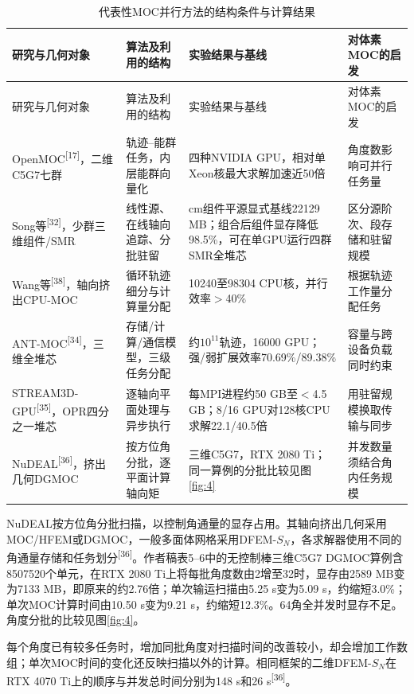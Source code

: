 \documentclass[UTF8, zihao=-4, fontset=none, a4paper]{ctexart}
\newcommand{\upcite}[1]{\textsuperscript{[#1]}}
\begin{document}
\begin{longtable}{@{}>{\raggedright\arraybackslash}p{}>{\raggedright\arraybackslash}p{}>{\raggedright\arraybackslash}p{}>{\raggedright\arraybackslash}p{}@{}}
\caption{代表性MOC并行方法的结构条件与计算结果}\label{tab:2}\\
\toprule
研究与几何对象 & 算法及利用的结构 & 实验结果与基线 & 对体素MOC的启发 \\
\midrule
\endfirsthead
\toprule
研究与几何对象 & 算法及利用的结构 & 实验结果与基线 & 对体素MOC的启发 \\
\midrule
\endhead
\bottomrule
\endlastfoot
OpenMOC\upcite{17}，二维C5G7七群 & 轨迹--能群任务，内层能群向量化 & 四种NVIDIA GPU，相对单Xeon核最大求解加速近50倍 & 角度数影响可并行任务量 \\
Song等\upcite{32}，少群三维组件/SMR & 线性源、在线轴向追踪、分批驻留 & 25 cm组件平源显式基线22129 MB；组合后组件显存降低98.5\%，可在单GPU运行四群SMR全堆芯 & 区分源阶次、段存储和驻留规模 \\
Wang等\upcite{38}，轴向挤出CPU-MOC & 循环轨迹细分与计算量分配 & 10240至98304 CPU核，并行效率$>$40\% & 根据轨迹工作量分配任务 \\
ANT-MOC\upcite{34}，三维全堆芯 & 存储/计算/通信模型，三级任务分配 & 约$10^{11}$轨迹，16000 GPU；强/弱扩展效率70.69\%/89.38\% & 容量与跨设备负载同时约束 \\
STREAM3D-GPU\upcite{35}，OPR四分之一堆芯 & 逐轴向平面处理与异步执行 & 每MPI进程约50 GB至$<$4.5 GB；8/16 GPU对128核CPU求解22.1/40.5倍 & 用驻留规模换取传输与同步 \\
NuDEAL\upcite{36}，挤出几何DGMOC & 按方位角分批，逐平面计算轴向矩 & 三维C5G7，RTX 2080 Ti；同一算例的分批比较见图\ref{fig:4} & 并发数量须结合角内任务规模 \\
\end{longtable}

NuDEAL按方位角分批扫描，以控制角通量的显存占用。其轴向挤出几何采用MOC/HFEM或DGMOC，一般多面体网格采用DFEM-$S_N$，各求解器使用不同的角通量存储和任务划分\upcite{36}。作者稿表5--6中的无控制棒三维C5G7 DGMOC算例含8507520个单元，在RTX 2080 Ti上将每批角度数由2增至32时，显存由2589 MB变为7133 MB，即原来的约2.76倍；单次输运扫描由5.25 s变为5.09 s，约缩短3.0\%；单次MOC计算时间由10.50 s变为9.21 s，约缩短12.3\%。64角全并发时显存不足。角度分批的比较见图\ref{fig:4}。

每个角度已有较多任务时，增加同批角度对扫描时间的改善较小，却会增加工作数组；单次MOC时间的变化还反映扫描以外的计算。相同框架的二维DFEM-$S_N$在RTX 4070 Ti上的顺序与并发总时间分别为148 s和26 s\upcite{36}。
\end{document}
